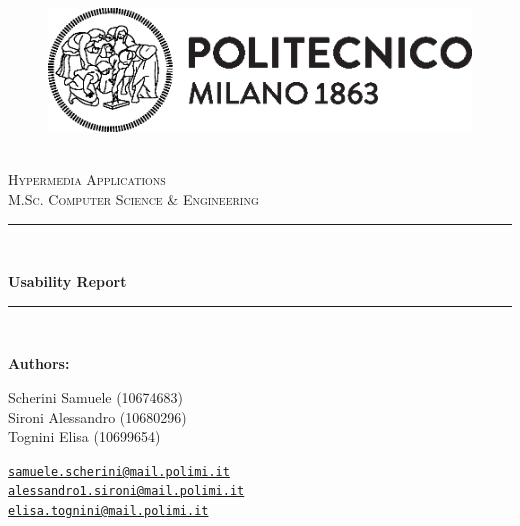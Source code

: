 \documentclass[11pt]{article} %
\newcommand{\HRule}{\rule{\linewidth}{0.5mm}} %
\begin{document}
\begin{center}
    \begin{figure}
        \vspace{-1.0cm}
        \includegraphics[scale = 1, center]{Images/logo_polimi_scritta2.eps} %
    \end{figure}
    \mbox{}\\[2.0cm]
    \textsc{\Huge Hypermedia Applications}\\[2.5cm]
    \textsc{\LARGE M.Sc. Computer Science \& Engineering}\\[2.0cm]
    \HRule\\[0.4cm]
    {\large \bf {\selectfont Usability Report}\\[0.2cm]
    \HRule\\[1.5cm]}
\end{center}

\begin{flushleft}
    \textbf{\selectfont Authors:}
\end{flushleft}

\begin{center}
    \begin{minipage}{0.5\textwidth}
        \begin{flushleft}
            Scherini Samuele (10674683)\\
            Sironi Alessandro (10680296)\\
            Tognini Elisa (10699654)\\
        \end{flushleft}
    \end{minipage}%
    \begin{minipage}{0.5\textwidth}
        \begin{flushright}
            \href{mailto:samuele.scherini@mail.polimi.it}{\texttt{samuele.scherini@mail.polimi.it}}\\
            \href{mailto:alessandro1.sironi@mail.polimi.it}{\texttt{alessandro1.sironi@mail.polimi.it}}\\
            \href{mailto:elisa.tognini@mail.polimi.it}{\texttt{elisa.tognini@mail.polimi.it}}
        \end{flushright}
    \end{minipage}
\end{center}
    
\end{document}
